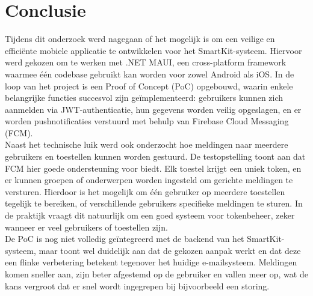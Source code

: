 
\chapter{Conclusie}%
\label{ch:conclusie}


Tijdens dit onderzoek werd nagegaan of het mogelijk is om een veilige en efficiënte mobiele applicatie te ontwikkelen voor het SmartKit-systeem. Hiervoor werd gekozen om te werken met .NET MAUI, een cross-platform framework waarmee één codebase gebruikt kan worden voor zowel Android als iOS. In de loop van het project is een Proof of Concept (PoC) opgebouwd, waarin enkele belangrijke functies succesvol zijn geïmplementeerd: gebruikers kunnen zich aanmelden via JWT-authenticatie, hun gegevens worden veilig opgeslagen, en er worden pushnotificaties verstuurd met behulp van Firebase Cloud Messaging (FCM).\\

Naast het technische luik werd ook onderzocht hoe meldingen naar meerdere gebruikers en toestellen kunnen worden gestuurd. De testopstelling toont aan dat FCM hier goede ondersteuning voor biedt. Elk toestel krijgt een uniek token, en er kunnen groepen of onderwerpen worden ingesteld om gerichte meldingen te versturen. Hierdoor is het mogelijk om één gebruiker op meerdere toestellen tegelijk te bereiken, of verschillende gebruikers specifieke meldingen te sturen. In de praktijk vraagt dit natuurlijk om een goed systeem voor tokenbeheer, zeker wanneer er veel gebruikers of toestellen zijn.\\

De PoC is nog niet volledig geïntegreerd met de backend van het SmartKit-systeem, maar toont wel duidelijk aan dat de gekozen aanpak werkt en dat deze een flinke verbetering betekent tegenover het huidige e-mailsysteem. Meldingen komen sneller aan, zijn beter afgestemd op de gebruiker en vallen meer op, wat de kans vergroot dat er snel wordt ingegrepen bij bijvoorbeeld een storing.\\

